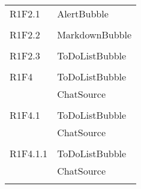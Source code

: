 \begin{center}
\begin{longtable}{|p{7cm}|p{5cm}|}
		R1F2.1 & AlertBubble \\ & \\ \hline
		R1F2.2 & MarkdownBubble \\ & \\ \hline
		R1F2.3 & ToDoListBubble \\ & \\ \hline
		R1F4 & ToDoListBubble \\ & ChatSource \\ & \\ \hline
		R1F4.1 & ToDoListBubble \\ & ChatSource \\ & \\ \hline
		R1F4.1.1 & ToDoListBubble \\ & ChatSource \\ & \\ \hline
	\end{longtable}
\end{center}
